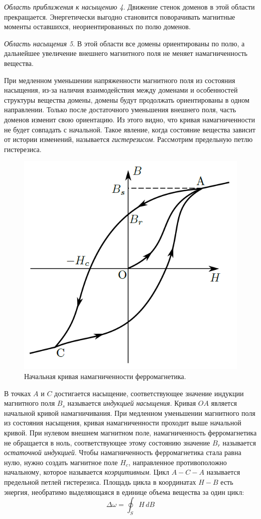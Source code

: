 \textit{Область приближения к насыщению 4}. Движение стенок доменов в этой области прекращается. Энергетически выгодно становится поворачивать магнитные моменты оставшихся, неориентированных по полю доменов.

\textit{Область насыщения 5}. В этой области все домены ориентированы по полю, а дальнейшее увеличение внешнего магнитного поля не меняет намагниченность вещества.

При медленном уменьшении напряженности магнитного поля из состояния насыщения, из-за наличия взаимодействия между доменами и особенностей структуры вещества домены, домены будут продолжать ориентированы в одном направлении. Только после достаточного уменьшения внешнего поля, часть доменов изменит свою ориентацию. Из этого видно, что кривая намагниченности не будет совпадать с начальной. Такое явление, когда состояние вещества зависит от истории изменений, называется \textit{гистерезисом}. Рассмотрим предельную петлю гистерезиса.

\begin{figure}
	\vspace{-10pt}
	\centering
	\includegraphics[width=0.90\linewidth]{../res/hysteresis.png}
	\caption{Начальная кривая намагниченности ферромагнетика.}
	\label{img:domen}
\end{figure}

В точках $A$ и $C$ достигается насыщение, соответствующее значение индукции магнитного поля $B_s$ называется \textit{индукцией насыщения}. Кривая $OA$ является начальной кривой намагничивания. При медленном уменьшении магнитного поля из состояния насыщения, кривая намагниченности проходит выше начальной кривой. При нулевом внешнем магнитном поле, намагниченность ферромагнетика не обращается в ноль, соответствующее этому состоянию значение $B_r$ называется \textit{остаточной индукцией}. Чтобы намагниченность ферромагнетика стала равна нулю, нужно создать магнитное поле $H_c$, направленное противоположно начальному, которое называется \textit{коэрцитивным}. Цикл $A-C-A$ называется предельной петлей гистерезиса. Площадь цикла в координатах $H-B$ есть энергия, необратимо выделяющаяся в единице объема вещества за один цикл:
$$
\Delta \omega = \oint_S H \,dB
$$

